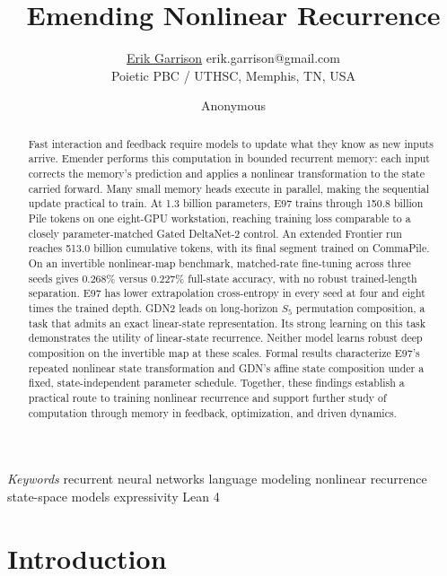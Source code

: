 \documentclass[10pt]{article}
\author{\name \href{http://orcid.org/0000-0003-3821-631X}{Erik Garrison} \email erik.garrison@gmail.com\\
  \addr Poietic PBC / UTHSC, Memphis, TN, USA}
\author{Anonymous}
\title{Emending Nonlinear Recurrence}
\theoremstyle{canonical}
\theoremstyle{canonicalbullet}
\begin{document}
\maketitle
\begin{abstract}
Fast interaction and feedback require models to update what they know as new inputs arrive. Emender performs this computation in bounded recurrent memory: each input corrects the memory's prediction and applies a nonlinear transformation to the state carried forward. Many small memory heads execute in parallel, making the sequential update practical to train. At 1.3 billion parameters, E97 trains through 150.8 billion Pile tokens on one eight-GPU workstation, reaching training loss comparable to a closely parameter-matched Gated DeltaNet-2 control. An extended Frontier run reaches 513.0 billion cumulative tokens, with its final segment trained on CommaPile. On an invertible nonlinear-map benchmark, matched-rate fine-tuning across three seeds gives 0.268\% versus 0.227\% full-state accuracy, with no robust trained-length separation. E97 has lower extrapolation cross-entropy in every seed at four and eight times the trained depth. GDN2 leads on long-horizon ${S }_{5}$ permutation composition, a task that admits an exact linear-state representation. Its strong learning on this task demonstrates the utility of linear-state recurrence. Neither model learns robust deep composition on the invertible map at these scales. Formal results characterize E97's repeated nonlinear state transformation and GDN's affine state composition under a fixed, state-independent parameter schedule. Together, these findings establish a practical route to training nonlinear recurrence and support further study of computation through memory in feedback, optimization, and driven dynamics.
\end{abstract}
\emph{Keywords} recurrent neural networks \textperiodcentered{} language modeling \textperiodcentered{} nonlinear recurrence \textperiodcentered{} state-space models \textperiodcentered{} expressivity \textperiodcentered{} Lean 4















\section{Introduction}\label{sec:intro}
\end{document}
